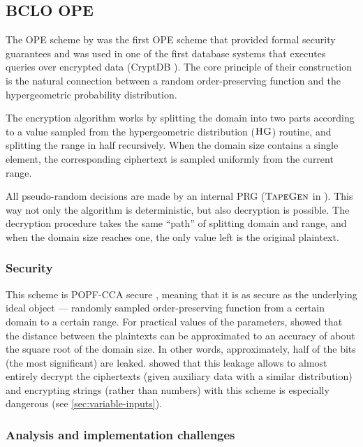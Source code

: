 \subsection{BCLO OPE}

	The OPE scheme by \textcite{bclo-ope} was the first OPE scheme that provided formal security guarantees and was used in one of the first database systems that executes queries over encrypted data (CryptDB \cite{crypt-db}).
 	The core principle of their construction is the natural connection between a random order-preserving function and the hypergeometric probability distribution.

	The encryption algorithm works by splitting the domain into two parts according to a value sampled from the hypergeometric distribution ($\textsc{HG}$) routine, and splitting the range in half recursively.
	When the domain size contains a single element, the corresponding ciphertext is sampled uniformly from the current range.

	All pseudo-random decisions are made by an internal PRG ($\textsc{TapeGen}$ in \cite{bclo-ope}).
	This way not only the algorithm is deterministic, but also decryption is possible.
	The decryption procedure takes the same ``path'' of splitting domain and range, and when the domain size reaches one, the only value left is the original plaintext.

	\subsubsection{Security}
		This scheme is POPF-CCA secure \cite{bclo-ope}, meaning that it is as secure as the underlying ideal object --- randomly sampled order-preserving function from a certain domain to a certain range.
		For practical values of the parameters, \textcite{ope-leakage} showed that the distance between the plaintexts can be approximated to an accuracy of about the square root of the domain size.
		In other words, approximately, half of the bits (the most significant) are leaked.
		\textcite{leakage-abuse-grubs-2017} showed that this leakage allows to almost entirely decrypt the ciphertexts (given auxiliary data with a similar distribution) and encrypting strings (rather than numbers) with this scheme is especially dangerous (see \cref{sec:variable-inputs}).

	\subsubsection{Analysis and implementation challenges}

